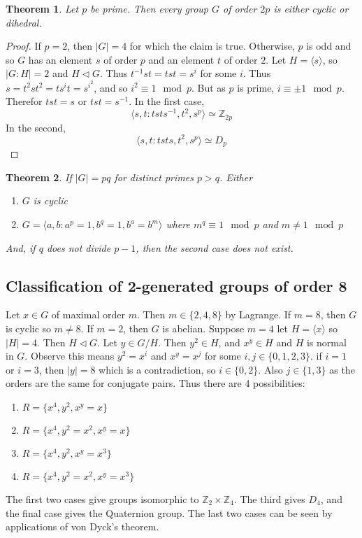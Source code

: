 \documentclass[a4paper,10pt]{article}
\newcommand{\ZZ}{\mathbb{Z}}
\newtheorem{thm}{Theorem}
\begin{document}
\begin{thm}
Let $p$ be prime. Then every group $G$ of order $2p$ is either cyclic or dihedral. 
\end{thm}

\begin{proof}
If $p = 2$, then $|G| = 4$ for which the claim is true. Otherwise, $p$ is odd and so $G$ has an element $s$ of order $p$ and an element $t$ of order $2$. Let $H = \langle s \rangle$, so $|G:H| = 2$ and $H \triangleleft G$. Thus $t^{-1} s t = tst = s^i$ for some $i$. Thus $s = t^2 s t^2 = t s^i t = s^{i^2}$, and so $i^2 \equiv 1 \mod p$. But as $p$ is prime, $i \equiv \pm 1 \mod p$. Therefor $tst = s$ or $tst = s^{-1}$. In the first case, 
\[ \langle s,t : tsts^{-1}, t^2, s^p \rangle \simeq \ZZ_{2p} \]
In the second, 
\[ \langle s,t : tsts, t^2, s^p \rangle \simeq D_p \]
\end{proof}

\begin{thm}
If $|G| = pq$ for distinct primes $p > q$. Either
\begin{enumerate}
\item $G$ is cyclic 
\item $G = \langle a,b : a^p = 1, b^q = 1, b^a = b^m \rangle$ where $m^q \equiv 1 \mod p$ and $m \neq 1 \mod p$
\end{enumerate}
And, if $q$ does not divide $p - 1$, then the second case does not exist. 
\end{thm}


\subsection{Classification of 2-generated groups of order 8}
Let $x \in G$ of maximal order $m$. Then $m \in \{ 2,4,8 \}$ by Lagrange. If $m = 8$, then $G$ is cyclic so $m \neq 8$. If $m = 2$, then $G$ is abelian. Suppose $m = 4$ let $H = \langle x \rangle$ so $|H| = 4$. Then $H \triangleleft G$. Let $y \in G / H$. Then $y^2 \in H$, and $x^y \in H$ and $H$ is normal in $G$. Observe this means $y^2 = x^i$ and $x^y = x^j$ for some $i,j \in \{0,1,2,3\}$. if $i = 1$ or $i = 3$, then $|y| = 8$ which is a contradiction, so $i \in \{0,2\}$. Also $j \in \{1,3\}$ as the orders are the same for conjugate pairs. Thus there are 4 possibilities:
\begin{enumerate}
\item $R = \{ x^4, y^2, x^y = x\}$ 
\item $R = \{ x^4, y^2 = x^2, x^y = x\}$ 
\item $R = \{ x^4, y^2, x^y = x^3\}$ 
\item $R = \{ x^4, y^2 = x^2, x^y = x^3\}$ 
\end{enumerate}
The first two cases give groups isomorphic to $\ZZ_2 \times \ZZ_4$. The third gives $D_4$, and the final case gives the Quaternion group. The last two cases can be seen by applications of von Dyck's theorem. 
 
\end{document}

